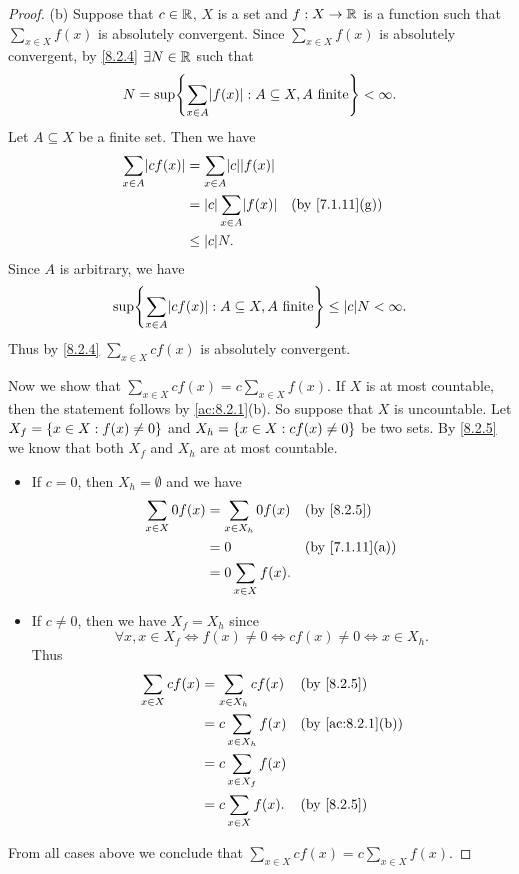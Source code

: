 \begin{proof}{(b)}
	Suppose that \(c \in \mathbb{R}\), \(X\) is a set and \(f : X \to \mathbb{R}\) is a function such that \(\sum_{x \in X} f(x)\) is absolutely convergent.
	Since \(\sum_{x \in X} f(x)\) is absolutely convergent, by \cref{8.2.4} \(\exists N \in \mathbb{R}\) such that
	\[
		N = \sup\set{\sum_{x \in A} \abs{f(x)} : A \subseteq X, A \text{ finite}} < \infty.
	\]
	Let \(A \subseteq X\) be a finite set.
	Then we have
	\begin{align*}
		\sum_{x \in A} \abs{cf(x)} & = \sum_{x \in A} \abs{c}\abs{f(x)}                                   \\
		                           & = \abs{c}\sum_{x \in A} \abs{f(x)} &  & \text{(by \cref{7.1.11}(g))} \\
		                           & \leq \abs{c} N.
	\end{align*}
	Since \(A\) is arbitrary, we have
	\[
		\sup\set{\sum_{x \in A} \abs{cf(x)} : A \subseteq X, A \text{ finite}} \leq \abs{c}N < \infty.
	\]
	Thus by \cref{8.2.4} \(\sum_{x \in X} cf(x)\) is absolutely convergent.

	Now we show that \(\sum_{x \in X} cf(x) = c \sum_{x \in X} f(x)\).
	If \(X\) is at most countable, then the statement follows by \cref{ac:8.2.1}(b).
	So suppose that \(X\) is uncountable.
	Let \(X_f = \left\lbrace x \in X : f(x) \neq 0\right\rbrace\) and \(X_h = \left\lbrace x \in X : cf(x) \neq 0\right\rbrace\) be two sets.
	By \cref{8.2.5} we know that both \(X_f\) and \(X_h\) are at most countable.
	\begin{itemize}
		\item If \(c = 0\), then \(X_h = \emptyset\) and we have
		      \begin{align*}
			      \sum_{x \in X} 0f(x) & = \sum_{x \in X_h} 0f(x) &  & \by{8.2.5}                   \\
			                           & = 0                      &  & \text{(by \cref{7.1.11}(a))} \\
			                           & = 0 \sum_{x \in X} f(x).
		      \end{align*}
		\item If \(c \neq 0\), then we have \(X_f = X_h\) since
		      \[
			      \forall x, x \in X_f \iff f(x) \neq 0 \iff cf(x) \neq 0 \iff x \in X_h.
		      \]
		      Thus
		      \begin{align*}
			      \sum_{x \in X} cf(x) & = \sum_{x \in X_h} cf(x)  &  & \by{8.2.5}                     \\
			                           & = c \sum_{x \in X_h} f(x) &  & \text{(by \cref{ac:8.2.1}(b))} \\
			                           & = c \sum_{x \in X_f} f(x)                                     \\
			                           & = c \sum_{x \in X} f(x).  &  & \by{8.2.5}
		      \end{align*}
	\end{itemize}
	From all cases above we conclude that \(\sum_{x \in X} cf(x) = c \sum_{x \in X} f(x)\).
\end{proof}

